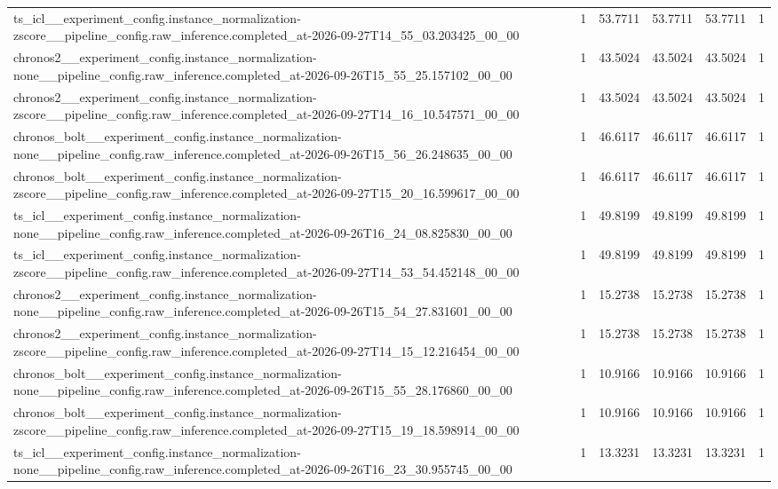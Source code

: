 \begin{tabular}{llllll}
ts\_icl\_\_experiment\_config.instance\_normalization-zscore\_\_pipeline\_config.raw\_inference.completed\_at-2026-09-27T14\_55\_03.203425\_00\_00 & 1 & 53.7711 & 53.7711 & 53.7711 & 1 \\
chronos2\_\_experiment\_config.instance\_normalization-none\_\_pipeline\_config.raw\_inference.completed\_at-2026-09-26T15\_55\_25.157102\_00\_00 & 1 & 43.5024 & 43.5024 & 43.5024 & 1 \\
chronos2\_\_experiment\_config.instance\_normalization-zscore\_\_pipeline\_config.raw\_inference.completed\_at-2026-09-27T14\_16\_10.547571\_00\_00 & 1 & 43.5024 & 43.5024 & 43.5024 & 1 \\
chronos\_bolt\_\_experiment\_config.instance\_normalization-none\_\_pipeline\_config.raw\_inference.completed\_at-2026-09-26T15\_56\_26.248635\_00\_00 & 1 & 46.6117 & 46.6117 & 46.6117 & 1 \\
chronos\_bolt\_\_experiment\_config.instance\_normalization-zscore\_\_pipeline\_config.raw\_inference.completed\_at-2026-09-27T15\_20\_16.599617\_00\_00 & 1 & 46.6117 & 46.6117 & 46.6117 & 1 \\
ts\_icl\_\_experiment\_config.instance\_normalization-none\_\_pipeline\_config.raw\_inference.completed\_at-2026-09-26T16\_24\_08.825830\_00\_00 & 1 & 49.8199 & 49.8199 & 49.8199 & 1 \\
ts\_icl\_\_experiment\_config.instance\_normalization-zscore\_\_pipeline\_config.raw\_inference.completed\_at-2026-09-27T14\_53\_54.452148\_00\_00 & 1 & 49.8199 & 49.8199 & 49.8199 & 1 \\
chronos2\_\_experiment\_config.instance\_normalization-none\_\_pipeline\_config.raw\_inference.completed\_at-2026-09-26T15\_54\_27.831601\_00\_00 & 1 & 15.2738 & 15.2738 & 15.2738 & 1 \\
chronos2\_\_experiment\_config.instance\_normalization-zscore\_\_pipeline\_config.raw\_inference.completed\_at-2026-09-27T14\_15\_12.216454\_00\_00 & 1 & 15.2738 & 15.2738 & 15.2738 & 1 \\
chronos\_bolt\_\_experiment\_config.instance\_normalization-none\_\_pipeline\_config.raw\_inference.completed\_at-2026-09-26T15\_55\_28.176860\_00\_00 & 1 & 10.9166 & 10.9166 & 10.9166 & 1 \\
chronos\_bolt\_\_experiment\_config.instance\_normalization-zscore\_\_pipeline\_config.raw\_inference.completed\_at-2026-09-27T15\_19\_18.598914\_00\_00 & 1 & 10.9166 & 10.9166 & 10.9166 & 1 \\
ts\_icl\_\_experiment\_config.instance\_normalization-none\_\_pipeline\_config.raw\_inference.completed\_at-2026-09-26T16\_23\_30.955745\_00\_00 & 1 & 13.3231 & 13.3231 & 13.3231 & 1 \\

\end{tabular}
